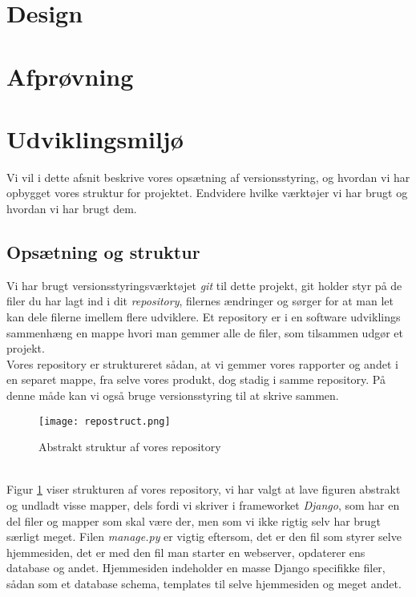 \documentclass[12pt]{article}
\begin{document}
\section{Design}
\label{sec:design}

\section{Afprøvning}
\label{sec:afproevning}

\section{Udviklingsmiljø}
\label{sec:udvikling}
Vi vil i dette afsnit beskrive vores opsætning af versionsstyring, og hvordan vi har opbygget vores struktur for projektet. Endvidere hvilke værktøjer vi har brugt og hvordan vi har brugt dem.

\subsection{Opsætning og struktur}
Vi har brugt versionsstyringsværktøjet \textit{git} til dette projekt, git holder styr på de filer du har lagt ind i dit \textit{repository}, filernes ændringer og sørger for at man let kan dele filerne imellem flere udviklere. Et repository er i en software udviklings sammenhæng en mappe hvori man gemmer alle de filer, som tilsammen udgør et projekt. \\
Vores repository er struktureret sådan, at vi gemmer vores rapporter og andet i en separet mappe, fra selve vores produkt, dog stadig i samme repository. På denne måde kan vi også bruge versionsstyring til at skrive sammen.

\begin{figure}[H]
	\centering
	\texttt{[image: repostruct.png]}
	 \caption{Abstrakt struktur af vores repository}
	 \label{fig:repostruct}
\end{figure}
~\\
Figur \ref{fig:repostruct} viser strukturen af vores repository, vi har valgt at lave figuren abstrakt og undladt visse mapper, dels fordi vi skriver i frameworket \textit{Django}, som har en del filer og mapper som skal være der, men som vi ikke rigtig selv har brugt særligt meget. Filen \textit{manage.py} er vigtig eftersom, det er den fil som styrer selve hjemmesiden, det er med den fil man starter en webserver, opdaterer ens database og andet. Hjemmesiden indeholder en masse Django specifikke filer, sådan som et database schema, templates til selve hjemmesiden og meget andet.
\end{document}
